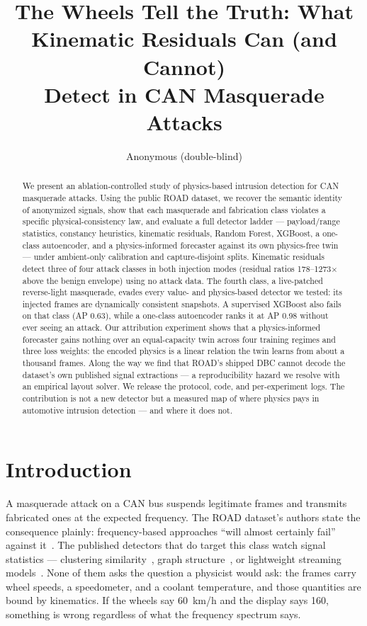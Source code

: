 \documentclass[10pt,twocolumn]{article}
\title{\textbf{The Wheels Tell the Truth: What Kinematic Residuals Can (and Cannot)\\ Detect in CAN Masquerade Attacks}}
\author{Anonymous (double-blind)}
\date{}
\begin{document}
\maketitle

\begin{abstract}
We present an ablation-controlled study of physics-based intrusion detection for CAN masquerade attacks. Using the public ROAD dataset, we recover the semantic identity of anonymized signals, show that each masquerade and fabrication class violates a specific physical-consistency law, and evaluate a full detector ladder --- payload/range statistics, constancy heuristics, kinematic residuals, Random Forest, XGBoost, a one-class autoencoder, and a physics-informed forecaster against its own physics-free twin --- under ambient-only calibration and capture-disjoint splits. Kinematic residuals detect three of four attack classes in both injection modes (residual ratios 178--1273$\times$ above the benign envelope) using no attack data. The fourth class, a live-patched reverse-light masquerade, evades every value- and physics-based detector we tested: its injected frames are dynamically consistent snapshots. A supervised XGBoost also fails on that class (AP 0.63), while a one-class autoencoder ranks it at AP 0.98 without ever seeing an attack. Our attribution experiment shows that a physics-informed forecaster gains nothing over an equal-capacity twin across four training regimes and three loss weights: the encoded physics is a linear relation the twin learns from about a thousand frames. Along the way we find that ROAD's shipped DBC cannot decode the dataset's own published signal extractions --- a reproducibility hazard we resolve with an empirical layout solver. We release the protocol, code, and per-experiment logs. The contribution is not a new detector but a measured map of where physics pays in automotive intrusion detection --- and where it does not.
\end{abstract}

\section{Introduction}
A masquerade attack on a CAN bus suspends legitimate frames and transmits fabricated ones at the expected frequency. The ROAD dataset's authors state the consequence plainly: frequency-based approaches ``will almost certainly fail'' against it~\cite{verma2024}. The published detectors that do target this class watch signal statistics --- clustering similarity~\cite{moriano2022}, graph structure~\cite{marfo2025}, or lightweight streaming models~\cite{moriano2026}. None of them asks the question a physicist would ask: the frames carry wheel speeds, a speedometer, and a coolant temperature, and those quantities are bound by kinematics. If the wheels say 60~km/h and the display says 160, something is wrong regardless of what the frequency spectrum says.
\end{document}
